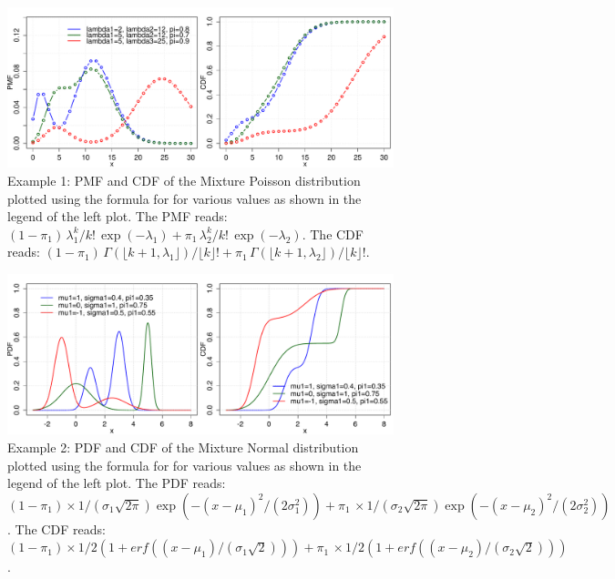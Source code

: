 \begin{figure}[htb!]
\centering
  \includegraphics[width=140mm]{pics/MixturePoisson.pdf}
 \caption{Example 1: PMF and CDF of the Mixture Poisson distribution plotted using the formula for 
 for various values as shown in the legend of the left plot. The PMF reads: $(1\!-\!\pi_1) \,\lambda_1^k/k! \,\exp(-\lambda_1) + \pi_1\,\lambda_2^k / k! \, \exp(-\lambda_2)$. The CDF reads: $(1-\pi_1)\,\Gamma(\lfloor k+1 , \lambda_1 \rfloor) / \lfloor k \rfloor!+\pi_1 \,\Gamma(\lfloor k+1 , \lambda_2 \rfloor) / \lfloor k \rfloor!$.}
 \label{fig:MixturePoisson_pmf_cdf}
\end{figure}
\begin{figure}[htb!]
\centering
  \includegraphics[width=140mm]{pics/MixtureNormal.pdf}
 \caption{Example 2: PDF and CDF of the Mixture Normal distribution plotted using the formula for 
 for various values as shown in the legend of the left plot. The PDF reads: $(1\!-\!\pi_1)\times1/(\sigma_1\sqrt{2\pi})\exp(-(x-\mu_1)^2/(2\sigma_1^2)) + \pi_1\,\times1/(\sigma_2\sqrt{2\pi})\exp(-(x-\mu_2)^2/(2\sigma_2^2))$. The CDF reads: $(1\!-\!\pi_1)\times1/2 (1 + erf((x-\mu_1)/(\sigma_1\sqrt{2})))  + \pi_1\,\times1/2  (1 + erf((x-\mu_2)/(\sigma_2\sqrt{2})))$.}
 \label{fig:MixtureNormal_pdf_cdf}
\end{figure}

